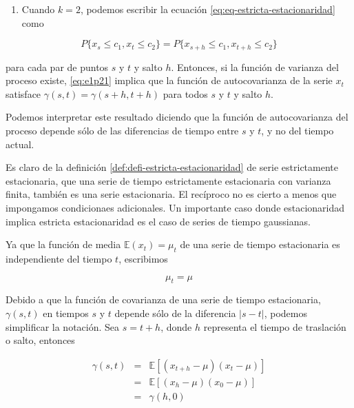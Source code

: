 \documentclass[12pt,]{krantz}
\providecommand{\tightlist}{%
  \setlength{\itemsep}{0pt}\setlength{\parskip}{0pt}}
\theoremstyle{definition}
\theoremstyle{definition}
\theoremstyle{definition}
\theoremstyle{remark}
\begin{document}
\begin{enumerate}
\def\labelenumi{\arabic{enumi})}
\setcounter{enumi}{1}
\tightlist
\item
  Cuando \(k=2\), podemos escribir la ecuación
  \eqref{eq:eq-estricta-estacionaridad} como
\end{enumerate}

\begin{equation}
  P\{x_s\leq c_1,x_t\leq c_2\}=P\{x_{s+h}\leq c_1,x_{t+h}\leq c_2\}
\label{eq:e1p21}
\end{equation}

para cada par de puntos \(s\) y \(t\) y salto \(h\). Entonces, si la
función de varianza del proceso existe, \eqref{eq:e1p21} implica que la
función de autocovarianza de la serie \(x_t\) satisface
\(\gamma(s,t)=\gamma(s+h,t+h)\) para todos \(s\) y \(t\) y salto \(h\).

Podemos interpretar este resultado diciendo que la función de
autocovarianza del proceso depende sólo de las diferencias de tiempo
entre \(s\) y \(t\), y no del tiempo actual.

Es claro de la definición \ref{def:defi-estricta-estacionaridad} de
serie estrictamente estacionaria, que una serie de tiempo estrictamente
estacionaria con varianza finita, también es una serie estacionaria. El
recíproco no es cierto a menos que impongamos condicionaes adicionales.
Un importante caso donde estacionaridad implica estricta estacionaridad
es el caso de series de tiempo gaussianas.

Ya que la función de media \(\mathbb{E}(x_t)=\mu_t\) de una serie de
tiempo estacionaria es independiente del tiempo \(t\), escribimos

\begin{equation}
\mu_t=\mu
\label{eq:e1p22}
\end{equation}

Debido a que la función de covarianza de una serie de tiempo
estacionaria, \(\gamma(s,t)\) en tiempos \(s\) y \(t\) depende sólo de
la diferencia \(|s-t|\), podemos simplificar la notación. Sea \(s=t+h\),
donde \(h\) representa el tiempo de traslación o salto, entonces

\begin{eqnarray}
\gamma(s,t)&=&\mathbb{E}[(x_{t+h}-\mu)(x_t-\mu)]\\ \nonumber
    &=&\mathbb{E}[(x_h-\mu)(x_0-\mu)]\\
    &=&\gamma(h,0) \nonumber
    \label{eq:eq-funcion-covarianza-estacionaria}
\end{eqnarray}
\end{document}
